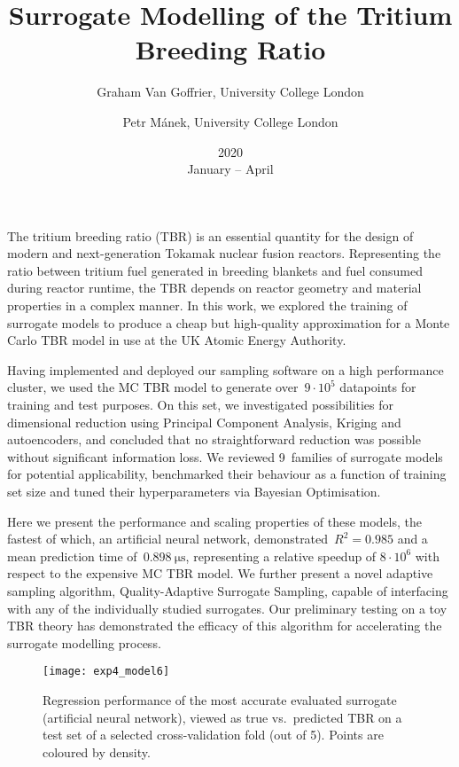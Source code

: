 \documentclass{article}
\title{Surrogate Modelling of the Tritium Breeding Ratio}
\date{2020\\ January -- April}
\author{
	Graham Van Goffrier, University College London\\
	\and Petr Mánek, University College London
}
\begin{document}
\maketitle

The tritium breeding ratio (TBR) is an essential quantity for the design of
modern and next-generation Tokamak nuclear fusion reactors. Representing the
ratio between tritium fuel generated in breeding blankets and fuel consumed
during reactor runtime, the TBR depends on reactor geometry and material
properties in a complex manner. In this work, we explored the
training of surrogate models to produce a cheap but high-quality approximation
for a Monte Carlo TBR model in use at the UK Atomic Energy Authority.

Having implemented and deployed our sampling software on a high performance cluster, we
used the MC TBR model to generate over~$9\cdot 10^5$ datapoints for training and
test purposes. On this set, we investigated possibilities for
dimensional reduction using Principal Component Analysis, Kriging and
autoencoders, and concluded that no straightforward reduction was possible
without significant information loss. We reviewed 9~families of surrogate models for potential
applicability, benchmarked their behaviour as a function of training set size and tuned their
hyperparameters via Bayesian Optimisation.

Here we present the
performance and scaling properties of these
models, the fastest of which, an artificial neural network,
demonstrated~$R^2=\num{0.985}$ and a mean
prediction time of~$\SI{0.898}{\micro\second}$, representing a relative speedup of $8\cdot 10^6$
with respect to the expensive MC TBR model. We further present a novel adaptive
sampling algorithm, Quality-Adaptive Surrogate Sampling, capable
of interfacing with any of the individually studied surrogates. Our preliminary
testing on a toy TBR theory has demonstrated the efficacy of this algorithm for
accelerating the surrogate modelling process.

\begin{figure}[h]
	\centering
	\texttt{[image: exp4\_model6]}
	\caption{Regression performance of the most accurate evaluated surrogate
		(artificial neural network), viewed as true vs.~predicted TBR on a test
		set of a selected cross-validation fold (out of 5). Points are coloured by density.}
\end{figure}
\end{document}

